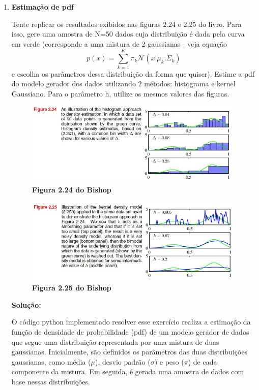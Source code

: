 \begin{enumerate}[label=E\arabic*]

\item \textbf{Estimação de pdf} \par
Tente replicar os resultados exibidos nas figuras 2.24 e 2.25 do livro. Para isso, gere uma amostra de N=50 dados cuja distribuição é dada pela curva em verde (corresponde a uma mistura de 2 gaussianas - veja equação 
$$p(x) = \sum_{k=1}^{K}\pi_k \mathcal{N} (x|\mu_k. \Sigma_k)$$ 
e escolha os parâmetros dessa distribuição da forma que quiser). Estime a pdf do modelo gerador dos dados utilizando 2 métodos: histograma e kernel Gaussiano. Para o parâmetro h, utilize os mesmos valores das figuras.
\begin{figure}[H]
    \caption{\textbf{Figura 2.24 do Bishop}}
       \centering
       \includegraphics{bishop_224.jpg}
\end{figure}
\begin{figure}[H]
    \caption{\textbf{Figura 2.25 do Bishop}}
       \centering
       \includegraphics{bishop_225.jpg}
\end{figure}
\par
\textbf{Solução:}

O código python implementado resolver esse exercício realiza a estimação da função de densidade de probabilidade (pdf) de um modelo gerador de dados que segue uma distribuição representada por uma mistura de duas gaussianas. Inicialmente, são definidos os parâmetros das duas distribuições gaussianas, como média ($\mu$), desvio padrão ($\sigma$) e peso ($\pi$) de cada componente da mistura. Em seguida, é gerada uma amostra de dados com base nessas distribuições.


\end{enumerate}
